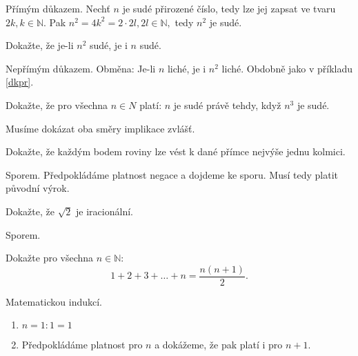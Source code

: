\begin{reseni}\label{dkpr}
Přímým důkazem. Nechť $n$ je sudé přirozené číslo, tedy lze jej zapsat ve tvaru $2k, k \in \mathbb N.$
Pak $n^2 = 4k^2 = 2\cdot 2l, 2l\in \mathbb N, $ tedy $n^2$ je sudé.
\end{reseni}

\begin{priklad}
Dokažte, že je-li $n^2$ sudé, je i $n$ sudé.
\end{priklad}

\begin{reseni}
Nepřímým důkazem. Obměna: Je-li $n$ liché, je i $n^2$ liché. Obdobně jako v příkladu \ref{dkpr}.
\end{reseni}

\begin{priklad}
Dokažte, že pro všechna $n\in N$ platí: $n$ je sudé právě tehdy, když $n^3$ je sudé.
\end{priklad}

\begin{reseni}
Musíme dokázat oba směry implikace zvlášť.
\end{reseni}

\begin{priklad}
Dokažte, že každým bodem roviny lze vést k dané přímce nejvýše jednu kolmici.
\end{priklad}

\begin{reseni}
Sporem. Předpokládáme platnost negace a dojdeme ke sporu. Musí tedy platit původní výrok.
\end{reseni}

\begin{priklad}
Dokažte, že $\sqrt{2} $ je iracionální.
\end{priklad}

\begin{reseni}
Sporem.
\end{reseni}

\begin{priklad}
Dokažte pro všechna $n\in \mathbb N: $
$$1+2+3+\dots+n=\frac{n(n+1)}{2}.$$
\end{priklad}

\begin{reseni}
Matematickou indukcí.
\begin{enumerate}[1.]
\item $n=1: 1=1$
\item Předpokládáme platnost pro $n$ a dokážeme, že pak platí i pro $n+1$.
\end{enumerate}
\end{reseni}
